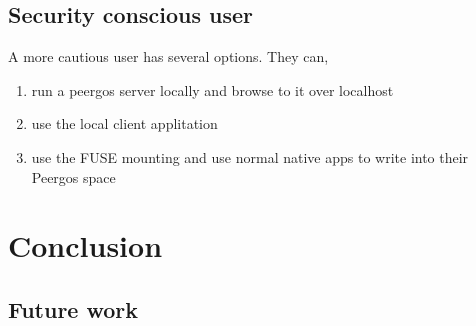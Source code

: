 \documentclass[12pt]{article}
\begin{document}
\subsection*{Security conscious user}
A more cautious user has several options. They can,
\begin{enumerate}
\item run a peergos server locally and browse to it over localhost
\item use the local client applitation
\item use the FUSE mounting and use normal native apps to write into their Peergos space
\end{enumerate}

\section*{Conclusion}

\subsection*{Future work}
\end{document}
